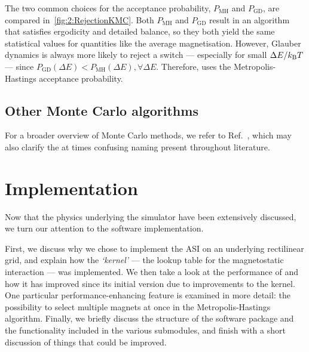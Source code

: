 The two common choices for the acceptance probability, $P_\mathrm{MH}$ and $P_\mathrm{GD}$, are compared in~\cref{fig:2:RejectionKMC}.
Both $P_\mathrm{MH}$ and $P_\mathrm{GD}$ result in an algorithm that satisfies ergodicity and detailed balance, so they both yield the same statistical values for quantities like the average magnetisation.
However, Glauber dynamics is always more likely to reject a switch --- especially for small $\Delta E / \kBT$ --- since $P_\mathrm{GD}(\Delta E) < P_\mathrm{MH}(\Delta E), \forall \Delta E$.
Therefore, \hotspice uses the Metropolis-Hastings acceptance probability.

\subsection{Other Monte Carlo algorithms} %
For a broader overview of Monte Carlo methods, we refer to Ref.~\cite{IntroductionMC}, which may also clarify the at times confusing naming present throughout literature. %

\section{Implementation}\label{sec:2:Implementation}
Now that the physics underlying the simulator have been extensively discussed, we turn our attention to the software implementation. \par
First, we discuss why we chose to implement the ASI on an underlying rectilinear grid, and explain how the \textit{`kernel'} --- the lookup table for the magnetostatic interaction --- was implemented.
We then take a look at the performance of \hotspice and how it has improved since its initial version due to improvements to the kernel.
One particular performance-enhancing feature is examined in more detail: the possibility to select multiple magnets at once in the Metropolis-Hastings algorithm.
Finally, we briefly discuss the structure of the software package and the functionality included in the various submodules, and finish with a short discussion of things that could be improved.

